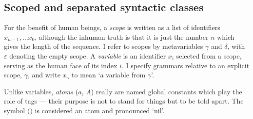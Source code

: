 \documentclass{jfp1}
\newcommand{\emp}{\varepsilon}
\newcommand{\Pa}[1]{\texttt{(}#1\texttt{)}}
\begin{document}
\subsection{Scoped and separated syntactic classes}

For the benefit of human beings, a \emph{scope} is written as a list of identifiers $x_{n-1},\ldots x_0$, although the inhuman truth is that it is just the number $n$
which gives the length of the sequence. I refer to scopes by
metavariables $\gamma$ and $\delta$, with $\emp$ denoting the empty
scope. A \emph{variable} is an identifier $x_i$ selected from
a scope, serving as the human face of its index $i$. I specify grammars
relative to an explicit scope, $\gamma$, and write $x_\gamma$ to
mean `a variable from $\gamma$'.

Unlike variables, \emph{atoms} ($a$, $A$) really are named global
constants which play the role of tags --- their purpose is not
to stand for things but to be told apart. The symbol $\Pa{}$ is
considered an atom and pronounced `nil'.

\newcommand{\lib}{\textbf{lib}}
\newcommand{\ess}{\textbf{ess}}
\newcommand{\cons}{\textbf{cons}}
\newcommand{\comp}{\textbf{comp}}
\end{document}
